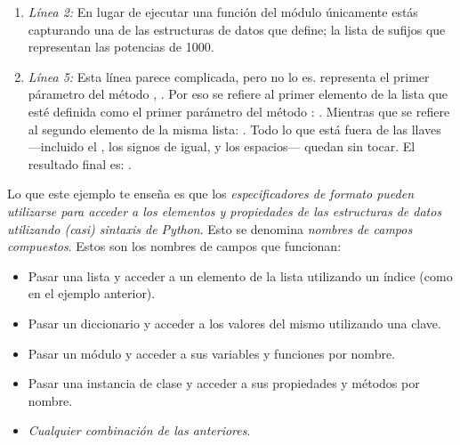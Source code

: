 \begin{enumerate}

\item \emph{Línea 2:} En lugar de ejecutar una función del módulo  únicamente estás capturando una de las estructuras de datos que define; la lista de sufijos que representan las potencias de 1000.

\item \emph{Línea 5:} Esta línea parece complicada, pero no lo es.  representa el primer párametro del método , . Por eso  se refiere al primer elemento de la lista que esté definida como el primer parámetro del método : . Mientras que  se refiere al segundo elemento de la misma lista: . Todo lo que está fuera de las llaves ---incluido el , los signos de igual, y los espacios--- quedan sin tocar. El resultado final es: .

\end{enumerate}


Lo que este ejemplo te enseña es que los \emph{especificadores de formato pueden utilizarse para acceder a los elementos y propiedades de las estructuras de datos utilizando (casi) sintaxis de Python}. Esto se denomina \emph{nombres de campos compuestos}. Estos son los nombres de campos que funcionan:

\begin{itemize}

\item Pasar una lista y acceder a un elemento de la lista utilizando un índice (como en el ejemplo anterior).

\item Pasar un diccionario y acceder a los valores del mismo utilizando una clave.

\item Pasar un módulo y acceder a sus variables y funciones por nombre.

\item Pasar una instancia de clase y acceder a sus propiedades y métodos por nombre.

\item \emph{Cualquier combinación de las anteriores}.

\end{itemize}

